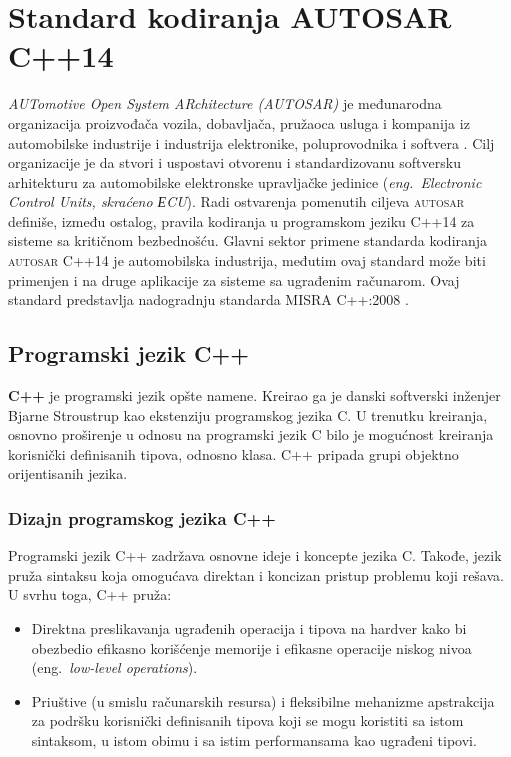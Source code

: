 \documentclass[12pt,oneside]{memoir}
\begin{document}
\chapter{Standard kodiranja \textsc{AUTOSAR} C++14}
\label{chp:autosar}

\textit{AUTomotive Open System ARchitecture (\textsc{AUTOSAR})} je međunarodna organizacija proizvođača vozila, dobavljača, pružaoca usluga i kompanija iz automobilske industrije i industrija elektronike, poluprovodnika i softvera \cite{autosarWebsite}. 
Cilj organizacije je da stvori i uspostavi otvorenu i standardizovanu softversku arhitekturu za automobilske elektronske upravljačke jedinice (\textit{eng.~Electronic Control Units, skra\'{c}eno ЕCU}).
Radi ostvarenja pomenutih ciljeva \textsc{autosar} definiše, između ostalog, pravila kodiranja u programskom jeziku C++14 za sisteme sa kriti\v{c}nom bezbedno\v{s}\'{c}u. Glavni sektor primene standarda kodiranja \textsc{autosar} C++14 je automobilska industrija, međutim ovaj standard može biti primenjen
i na druge aplikacije za sisteme sa ugrađenim računarom. Ovaj standard predstavlja nadogradnju standarda MISRA C++:2008 \cite{AutosarGuidelines}.

\section{Programski jezik C++}

\textbf{C++} je programski jezik op\v{s}te namene. Kreirao ga je danski softverski in\v{z}enjer Bjarne Stroustrup kao ekstenziju programskog jezika C. U trenutku kreiranja, osnovno pro\v{s}irenje u odnosu na programski jezik C bilo je mogu\'{c}nost kreiranja korisni\v{c}ki definisanih tipova, odnosno klasa. C++ pripada grupi objektno orijentisanih jezika. 

\subsection{Dizajn programskog jezika C++}

Programski jezik C++ zadr\v{z}ava osnovne ideje i koncepte jezika C. Takođe, jezik pru\v{z}a sintaksu koja omogu\'{c}ava direktan i koncizan pristup problemu koji re\v{s}ava.
U svrhu toga, C++ pru\v{z}a:
\begin{itemize}
  \item {Direktna preslikavanja ugrađenih operacija i tipova na hardver kako bi obezbedio efikasno kori\v{s}\'{c}enje memorije i efikasne operacije niskog nivoa (eng.~\textit{low-level operations}).}
  \item {Priu\v{s}tive (u smislu ra\v{c}unarskih resursa) i fleksibilne mehanizme apstrakcija za podr\v{s}ku korisni\v{c}ki definisanih tipova koji se mogu koristiti sa istom sintaksom, u istom obimu i sa istim performansama kao ugrađeni tipovi.}
\end{itemize}
\end{document}
